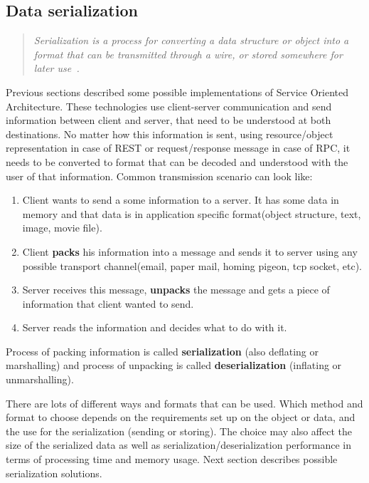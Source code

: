 \subsection{Data serialization}
\begin{quotation}
\textit{
Serialization is a process for converting a data structure or object into a format that
can be transmitted through a wire, or stored somewhere for later
use~\cite{json_vs_yaml}.
}
\end{quotation}
Previous sections described some possible implementations of Service Oriented
Architecture. These technologies use client-server communication and
send information between client and server, that need to be understood at both
destinations. No matter how this information is sent, using resource/object representation in case of REST or
request/response message in case of RPC, it needs to be converted to format that
can be decoded and understood with the user of that information. Common transmission scenario
can look like:
\begin{enumerate}
  \item Client wants to send a some information to a server. It has some data in
  memory and that data is in application specific format(object structure, text,
  image, movie file).
  \item Client \textbf{packs} his information into a message and sends it to
  server using any possible transport channel(email, paper mail, homing pigeon, tcp
  socket, etc).
  \item Server receives this message, \textbf{unpacks} the message and gets a
  piece of information that client wanted to send.
  \item Server reads the information and decides what to do with it.
\end{enumerate}

Process of packing information is called \textbf{serialization} (also deflating
or marshalling) and process of unpacking is called \textbf{deserialization}
(inflating or unmarshalling). 

There are lots of different ways and formats that can
be used. Which method and format to choose depends on the requirements set up on
the object or data, and the use for the serialization (sending or storing). The choice
may also affect the size of the serialized data as well as serialization/deserialization
performance in terms of processing time and memory usage\cite{json_vs_yaml}.
Next section describes possible serialization solutions.

